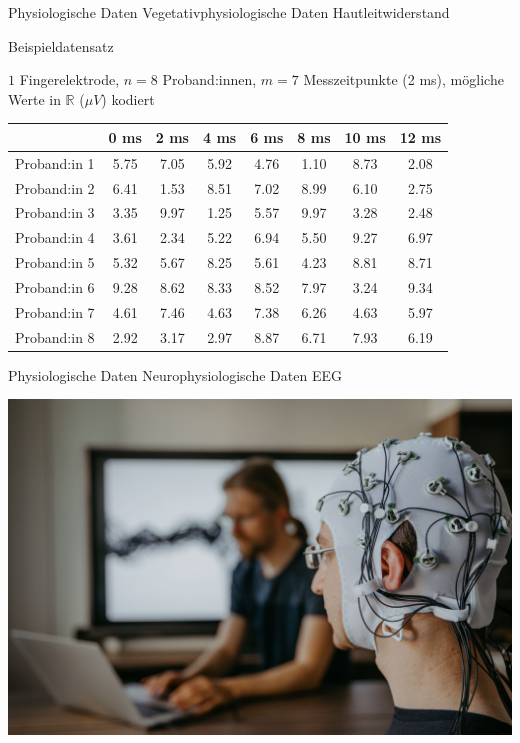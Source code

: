 \documentclass[
  8pt,
  ignorenonframetext,
]{beamer}
\begin{document}
\begin{frame}{Physiologische Daten}
\protect\hypertarget{physiologische-daten-2}{}
Vegetativphysiologische Daten \textbar{} Hautleitwiderstand

\small

Beispieldatensatz

\footnotesize
\vspace{1mm}

\(1\) Fingerelektrode, \(n = 8\) Proband:innen, \(m = 7\) Messzeitpunkte
(2 ms), mögliche Werte in \(\mathbb{R}\) (\(\mu V\)) kodiert
\vspace{1mm}

\begin{longtable}[]{@{}lccccccc@{}}
\toprule()
& 0 ms & 2 ms & 4 ms & 6 ms & 8 ms & 10 ms & 12 ms \\
\midrule()
\endhead
Proband:in 1 & 5.75 & 7.05 & 5.92 & 4.76 & 1.10 & 8.73 & 2.08 \\
Proband:in 2 & 6.41 & 1.53 & 8.51 & 7.02 & 8.99 & 6.10 & 2.75 \\
Proband:in 3 & 3.35 & 9.97 & 1.25 & 5.57 & 9.97 & 3.28 & 2.48 \\
Proband:in 4 & 3.61 & 2.34 & 5.22 & 6.94 & 5.50 & 9.27 & 6.97 \\
Proband:in 5 & 5.32 & 5.67 & 8.25 & 5.61 & 4.23 & 8.81 & 8.71 \\
Proband:in 6 & 9.28 & 8.62 & 8.33 & 8.52 & 7.97 & 3.24 & 9.34 \\
Proband:in 7 & 4.61 & 7.46 & 4.63 & 7.38 & 6.26 & 4.63 & 5.97 \\
Proband:in 8 & 2.92 & 3.17 & 2.97 & 8.87 & 6.71 & 7.93 & 6.19 \\
\bottomrule()
\end{longtable}
\end{frame}

\begin{frame}{Physiologische Daten}
\protect\hypertarget{physiologische-daten-3}{}
Neurophysiologische Daten \textbar{} EEG \vspace{5mm}

\begin{center}\includegraphics[width=0.7\linewidth]{3_Abbildungen/pfm_3_eeg} \end{center}
\end{frame}
\end{document}
